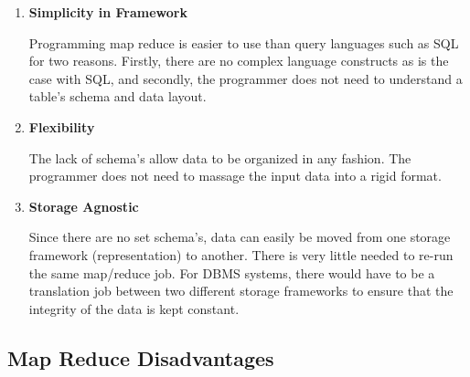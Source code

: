 \documentclass[10pt,twocolumn]{IEEEtran11}
\begin{document}
\begin {enumerate}
	\setlength\itemsep{1em}
	\item 
	
	\textbf{Simplicity in Framework}
	
	Programming map reduce is easier to use than query languages such as SQL for two reasons.  Firstly, there are no complex language constructs as is the case with SQL, and secondly, the programmer does not need to understand a table's schema and data layout.
	\item 
	
	\textbf{Flexibility}
	
	The lack of schema's allow data to be organized in any fashion.  The programmer does not need to massage the input data into a rigid format.
	
	\item 
	
	\textbf{Storage Agnostic}
	
	Since there are no set schema's, data can easily be moved from one storage framework (representation) to another.  There is very little needed to re-run the same map/reduce job.  
	For DBMS systems, there would have to be a translation job between two different storage frameworks to ensure that the integrity of the data is kept constant.
	
\end {enumerate}

\subsection{Map Reduce Disadvantages}
\end{document}
